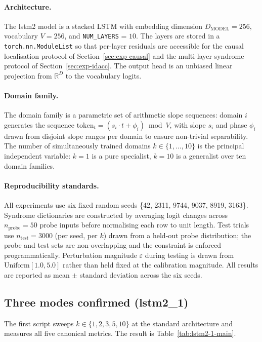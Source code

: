 \documentclass[11pt,a4paper]{article}
\begin{document}
\paragraph{Architecture.} The lstm2 model is a stacked LSTM with embedding dimension $D_{\mathrm{MODEL}} = 256$, vocabulary $V = 256$, and \texttt{NUM\_LAYERS} = $10$. The layers are stored in a \texttt{torch.nn.ModuleList} so that per-layer residuals are accessible for the causal localisation protocol of Section~\ref{sec:exp-causal} and the multi-layer syndrome protocol of Section~\ref{sec:exp-idacc}. The output head is an unbiased linear projection from $\mathbb{R}^D$ to the vocabulary logits.

\paragraph{Domain family.} The domain family is a parametric set of arithmetic slope sequences: domain $i$ generates the sequence $\mathrm{token}_t = (s_i \cdot t + \phi_i) \bmod V$, with slope $s_i$ and phase $\phi_i$ drawn from disjoint slope ranges per domain to ensure non-trivial separability. The number of simultaneously trained domains $k \in \{1, \ldots, 10\}$ is the principal independent variable: $k = 1$ is a pure specialist, $k = 10$ is a generalist over ten domain families.

\paragraph{Reproducibility standards.} All experiments use six fixed random seeds \{42, 2311, 9744, 9037, 8919, 3163\}. Syndrome dictionaries are constructed by averaging logit changes across $n_{\mathrm{probe}} = 50$ probe inputs before normalising each row to unit length. Test trials use $n_{\mathrm{test}} = 3000$ (per seed, per $k$) drawn from a held-out probe distribution; the probe and test sets are non-overlapping and the constraint is enforced programmatically. Perturbation magnitude $\varepsilon$ during testing is drawn from $\mathrm{Uniform}[1.0, 5.0]$ rather than held fixed at the calibration magnitude. All results are reported as mean $\pm$ standard deviation across the six seeds.


\subsection{Three modes confirmed (lstm2\_1)}
\label{sec:exp-modes}

The first script sweeps $k \in \{1, 2, 3, 5, 10\}$ at the standard architecture and measures all five canonical metrics. The result is Table~\ref{tab:lstm2-1-main}.
\end{document}
